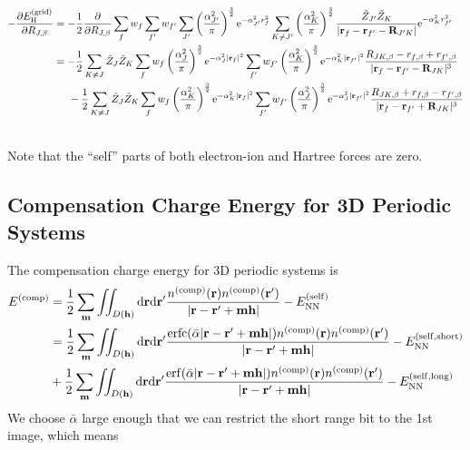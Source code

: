 \documentclass[paper=a4, fontsize=11pt]{article} %
\numberwithin{equation}{section} %
\numberwithin{figure}{section} %
\numberwithin{table}{section} %
\newcommand{\p}{\partial}
\newcommand{\bh}{{\bf{h}}}
\newcommand{\bm}{{\bf{m}}}
\newcommand{\br}{{\bf{r}}}
\newcommand{\bR}{{\bf{R}}}
\newcommand{\rNN}{{\mathrm{NN}}}
\newcommand{\rself}{{\mathrm{self}}}
\newcommand{\re}{{\mathrm{e}}}
\newcommand{\rshort}{{\mathrm{short}}}
\newcommand{\rlong}{{\mathrm{long}}}
\newcommand{\rerf}{{\mathrm{erf}}}
\newcommand{\rerfc}{{\mathrm{erfc}}}
\newcommand{\rd}{{\mathrm{d}}}
\newcommand{\rH}{{\mathrm{H}}}
\newcommand{\rcomp}{{\mathrm{comp}}}
\newcommand{\rgrid}{{\mathrm{grid}}}
\newcommand{\al}{{\alpha}}
\newcommand{\RJb}{{R_{J,\beta}}}
\newcommand{\bal}{{\bar{\alpha}}}
\begin{document}
\begin{equation}
\begin{split}
-\frac{\p E_{\rH}^{(\rgrid)}}{\p \RJb} &= -\frac{1}{2}\frac{\p}{\p \RJb}\sum_f w_f \sum_{f'} w_{f'} \sum_{J'} \left(\frac{\al_{J'}^2}{\pi}\right)^{\frac{3}{2}} \re^{-\al_{J'}^2 r_f^2} \sum_{K \neq J'} \left(\frac{\al_K^2}{\pi}\right)^{\frac{3}{2}} \frac{\tilde Z_{J'}\tilde Z_K}{|\br_f-\br_{f'}-\bR_{J'K}|} \re^{-\al_K^2 r_{f'}^2}\\
&= -\frac{1}{2}\sum_{K \neq J} \tilde Z_J\tilde Z_{K} \sum_f w_f \left(\frac{\al_{J}^2}{\pi}\right)^{\frac{3}{2}} \re^{-\al_{J}^2|\br_f|^2}\sum_{f'} w_{f'} \left(\frac{\al_{K}^2}{\pi}\right)^{\frac{3}{2}} \re^{-\al_{K}^2|\br_{f'}|^2}\frac{R_{JK,\beta}-r_{f,\beta}+r_{f',\beta}}{|\br_f - \br_{f'} - \bR_{JK}|^3}\\ 
&\hspace{5mm} -\frac{1}{2}\sum_{K \neq J} \tilde Z_J\tilde Z_{K} \sum_f w_f \left(\frac{\al_{K}^2}{\pi}\right)^{\frac{3}{2}} \re^{-\al_{K}^2|\br_f|^2}\sum_{f'} w_{f'} \left(\frac{\al_{J}^2}{\pi}\right)^{\frac{3}{2}} \re^{-\al_{J}^2|\br_{f'}|^2}\frac{R_{JK,\beta}+r_{f,\beta}-r_{f',\beta}}{|\br_f - \br_{f'} + \bR_{JK}|^3}\\ \\
\end{split}
\end{equation}

Note that the ``self'' parts of both electron-ion and Hartree forces are zero.

\subsection{Compensation Charge Energy for 3D Periodic Systems}
The compensation charge energy for 3D periodic systems is
\begin{equation}
\begin{split}
E^{(\rcomp)} 
&= \frac{1}{2}\sum_\bm \iint_{D(\bh)} \rd \br \rd \br' \frac{n^{(\rcomp)}(\br)n^{(\rcomp)}(\br')}{|\br-\br'+\bm\bh|} - E_{\rNN}^{(\rself)}\\
&= \frac{1}{2}\sum_\bm \iint_{D(\bh)} \rd \br \rd \br' \frac{\rerfc(\bal |\br-\br'+\bm\bh|)n^{(\rcomp)}(\br)n^{(\rcomp)}(\br')}{|\br-\br'+\bm\bh|} - E_{\rNN}^{(\rself,\rshort)} \\
&+ \frac{1}{2}\sum_\bm \iint_{D(\bh)} \rd \br \rd \br' \frac{\rerf(\bal |\br-\br'+\bm\bh|)n^{(\rcomp)}(\br)n^{(\rcomp)}(\br')}{|\br-\br'+\bm\bh|} - E_{\rNN}^{(\rself,\rlong)} \\
\end{split}
\end{equation}
We choose $\bal$ large enough that we can restrict the short range bit to the 1st image, which means
\end{document}
